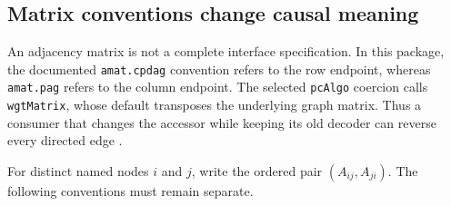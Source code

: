 \hypertarget{matrix-conventions-change-causal-meaning}{%
\subsection{Matrix conventions change causal
meaning}\label{matrix-conventions-change-causal-meaning}}

An adjacency matrix is not a complete interface specification. In this
package, the documented \texttt{amat.cpdag} convention refers to the row
endpoint, whereas \texttt{amat.pag} refers to the column endpoint. The
selected \texttt{pcAlgo} coercion calls \texttt{wgtMatrix}, whose
default transposes the underlying graph matrix. Thus a consumer that
changes the accessor while keeping its old decoder can reverse every
directed edge \citep{exec13_pcalg,exec13_pcalg_reuse_primary}.

For distinct named nodes \(i\) and \(j\), write the ordered pair
\((A_{ij},A_{ji})\). The following conventions must remain separate.


